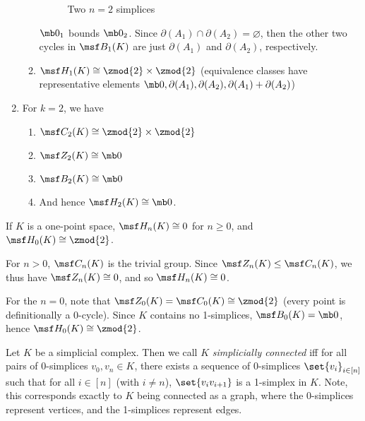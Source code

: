 \begin{solution}
\begin{enumerate}[label=(\roman*)]
\begin{enumerate}
\begin{figure}[H]
            \caption{Two $n=2$ simplices}
          \end{figure}
          $\mb 0_1$ bounds $\mb 0_2$. Since $\partial(A_1) \cap \partial(A_2) =
          \varnothing$, then the other two cycles in $\msf B_1(K)$ are just
          $\partial(A_1)$ and $\partial(A_2)$, respectively.
        \item $\msf H_1(K) \cong \zmod{2} \times \zmod{2}$ (equivalence classes
          have representative elements $\mb 0, \partial(A_1), \partial(A_2),
          \partial(A_1) + \partial(A_2)$)
      \end{enumerate}
    \item For $k=2$, we have
      \begin{enumerate}
        \item $\msf C_2(K) \cong \zmod{2} \times \zmod{2}$
        \item $\msf Z_2(K) \cong \mb 0$
        \item $\msf B_2(K) \cong \mb 0$
        \item And hence $\msf H_2(K) \cong \mb 0$.
      \end{enumerate}
  \end{enumerate}
\end{solution}
\begin{problem}[16.7]
  If $K$ is a one-point space, $\msf H_n(K) \cong 0$ for $n \geq 0$, and $\msf
  H_0(K) \cong \zmod{2}$.
\end{problem}
\begin{solution}
  For $n > 0$, $\msf C_n(K)$ is the trivial group. Since $\msf Z_n(K) \leq \msf
  C_n(K)$, we thus have $\msf Z_n(K) \cong 0$, and so $\msf H_n(K) \cong 0$.

  For the $n = 0$, note that $\msf Z_0(K) = \msf C_0(K) \cong \zmod{2}$ (every
  point is definitionally a 0-cycle). Since $K$ contains no 1-simplices, $\msf
  B_0(K) = \mb 0$, hence $\msf H_0(K) \cong \zmod{2}$.
\end{solution}
\begin{definition}
  Let $K$ be a simplicial complex. Then we call $K$ \emph{simplicially
    connected} iff for all pairs of 0-simplices $v_0, v_n \in K$, there exists a
  sequence of 0-simplices $\set{v_i}_{i\in [n]}$ such that for all $i \in [n]$
  (with $i \neq n$), $\set{v_iv_{i+1}}$ is a 1-simplex in $K$. Note, this
  corresponds exactly to $K$ being connected as a graph, where the 0-simplices
  represent vertices, and the 1-simplices represent edges.
\end{definition}
